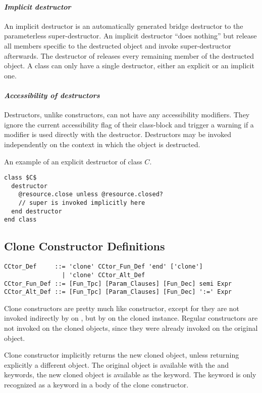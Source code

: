 \paragraph{\em Implicit destructor}
An implicit destructor is an automatically generated bridge destructor to the parameterless super-destructor. An implicit destructor ``does nothing'' but release all members specific to the destructed object and invoke super-destructor afterwards. The destructor of  releases every remaining member of the destructed object. A class can only have a single destructor, either an explicit or an implicit one. 

\paragraph{\em Accessibility of destructors}
Destructors, unlike constructors, can not have any accessibility modifiers. They ignore the current accessibility flag of their class-block and trigger a warning if a modifier is used directly with the destructor. Destructors may be invoked independently on the context in which the object is destructed. 

\example An example of an explicit destructor of class $C$. 
\begin{lstlisting}
class $C$
  destructor
    @resource.close unless @resource.closed?
    // super is invoked implicitly here
  end destructor
end class
\end{lstlisting}

\subsection{Clone Constructor Definitions}
\label{sec:clone-def}

\syntax\begin{lstlisting}
CCtor_Def     ::= 'clone' CCtor_Fun_Def 'end' ['clone']
                | 'clone' CCtor_Alt_Def
CCtor_Fun_Def ::= [Fun_Tpc] [Param_Clauses] [Fun_Dec] semi Expr
CCtor_Alt_Def ::= [Fun_Tpc] [Param_Clauses] [Fun_Dec] ':=' Expr
\end{lstlisting}

Clone constructors are pretty much like constructor, except for they are not invoked indirectly by  on , but by  on the cloned instance. Regular constructors are not invoked on the cloned objects, since they were already invoked on the original object. 

Clone constructor implicitly returns the new cloned object, unless returning explicitly a different object. The original object is available with the  and  keywords, the new cloned object is available as the  keyword. The  keyword is only recognized as a keyword in a body of the clone constructor. 

